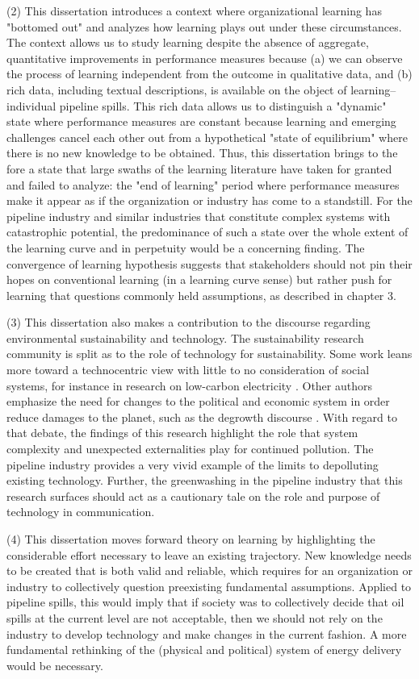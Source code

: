 (2) This dissertation introduces a context where organizational learning has "bottomed out" and analyzes how learning plays out under these circumstances. The context allows us to study learning despite the absence of aggregate, quantitative improvements in performance measures because (a) we can observe the process of learning independent from the outcome in qualitative data, and (b) rich data, including textual descriptions, is available on the object of learning--individual pipeline spills. This rich data allows us to distinguish a "dynamic" state where performance measures are constant because learning and emerging challenges cancel each other out from a hypothetical "state of equilibrium" where there is no new knowledge to be obtained. Thus, this dissertation brings to the fore a state that large swaths of the learning literature have taken for granted and failed to analyze: the "end of learning" period where performance measures make it appear as if the organization or industry has come to a standstill. For the pipeline industry and similar industries that constitute complex systems with catastrophic potential, the predominance of such a state over the whole extent of the learning curve and in perpetuity would be a concerning finding. The convergence of learning hypothesis suggests that stakeholders should not pin their hopes on conventional learning (in a learning curve sense) but rather push for learning that questions commonly held assumptions, as described in chapter 3.

(3) This dissertation also makes a contribution to the discourse regarding environmental sustainability and technology. The sustainability research community is split as to the role of technology for sustainability. Some work leans more toward a technocentric view with little to no consideration of social systems, for instance in research on low-carbon electricity \citep[e.g.,][]{Greenblatt2017}. Other authors emphasize the need for changes to the political and economic system in order reduce damages to the planet, such as the degrowth discourse \citep{Kallis2018}. With regard to that debate, the findings of this research highlight the role that system complexity and unexpected externalities play for continued pollution. The pipeline industry provides a very vivid example of the limits to depolluting existing technology. Further, the greenwashing in the pipeline industry that this research surfaces should act as a cautionary tale on the role and purpose of technology in communication.

(4) This dissertation moves forward theory on learning by highlighting the considerable effort necessary to leave an existing trajectory. New knowledge needs to be created that is both valid and reliable, which requires for an organization or industry to collectively question preexisting fundamental assumptions. Applied to pipeline spills, this would imply that if society was to collectively decide that oil spills at the current level are not acceptable, then we should not rely on the industry to develop technology and make changes in the current fashion. A more fundamental rethinking of the (physical and political) system of energy delivery would be necessary.

